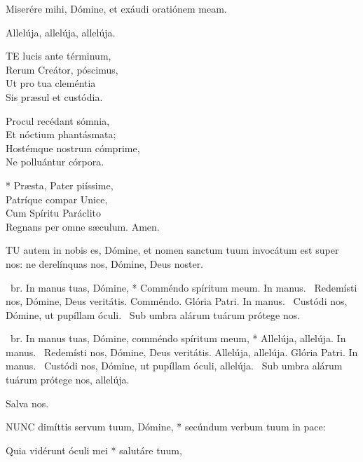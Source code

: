 
 Miserére mihi, Dómine, et exáudi oratiónem meam.


 Allelúja, allelúja, allelúja.


\lettrine[lines=2]{T}{E} lucis ante términum,\\
Rerum Creátor, póscimus,\\
Ut pro tua cleméntia\\
Sis præsul et custódia.

Procul recédant sómnia,\\
Et nóctium phantásmata;\\
Hostémque nostrum cómprime,\\
Ne polluántur córpora.

* Præsta, Pater piíssime,\\
Patríque compar Unice,\\
Cum Spíritu Paráclito\\
Regnans per omne sæculum. Amen.


\lettrine[lines=2]{T}{U} autem in nobis es, Dómine, et nomen sanctum tuum invocátum est super nos: ne derelínquas nos, Dómine, Deus noster.

\R\ br. In manus tuas, Dómine, * Comméndo spíritum meum. In manus. \V\ Redemísti nos, Dómine, Deus veritátis. Comméndo. Glória Patri. In manus. \V\ Custódi nos, Dómine, ut pupíllam óculi. \R\ Sub umbra alárum tuárum prótege nos.



\R\ br. In manus tuas, Dómine, comméndo spíritum meum, * Allelúja, allelúja. In manus. \V\ Redemísti nos, Dómine, Deus veritátis. Allelúja, allelúja. Glória Patri. In manus. \V\ Custódi nos, Dómine, ut pupíllam óculi, allelúja. \R\ Sub umbra alárum tuárum prótege nos, allelúja.

 Salva nos.


\lettrine[lines=2]{N}{UNC} dimíttis servum tuum, Dómine, * secúndum verbum tuum in pace:

Quia vidérunt óculi mei * salutáre tuum,

